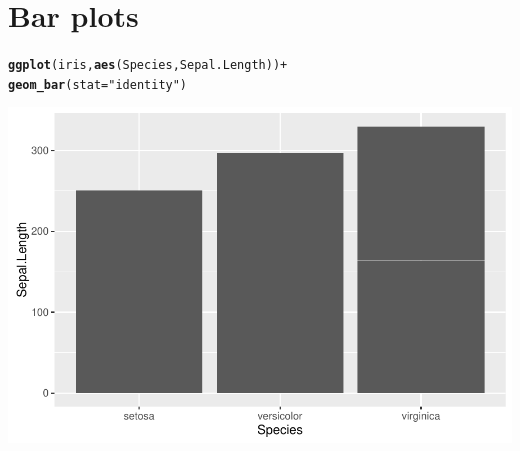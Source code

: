 \documentclass{beamer}\usepackage[]{graphicx}\usepackage[]{color}
\makeatletter
\newcommand{\hlstr}[1]{\textcolor[rgb]{0.192,0.494,0.8}{#1}}%
\newcommand{\hlopt}[1]{\textcolor[rgb]{0,0,0}{#1}}%
\newcommand{\hlstd}[1]{\textcolor[rgb]{0.345,0.345,0.345}{#1}}%
\newcommand{\hlkwc}[1]{\textcolor[rgb]{0.333,0.667,0.333}{#1}}%
\newcommand{\hlkwd}[1]{\textcolor[rgb]{0.737,0.353,0.396}{\textbf{#1}}}%
\newenvironment{kframe}{%
 \def\at@end@of@kframe{}%
 \ifinner\ifhmode%
  \def\at@end@of@kframe{\end{minipage}}%
  \begin{minipage}{\columnwidth}%
 \fi\fi%
 \def\FrameCommand##1{\hskip\@totalleftmargin \hskip-\fboxsep
 \colorbox{shadecolor}{##1}\hskip-\fboxsep
     \hskip-\linewidth \hskip-\@totalleftmargin \hskip\columnwidth}%
 \MakeFramed {\advance\hsize-\width
   \@totalleftmargin\z@ \linewidth\hsize
   \@setminipage}}%
 {\par\unskip\endMakeFramed%
 \at@end@of@kframe}
\newenvironment{knitrout}{}{} %
\makeatother
\begin{document}

\section*{Bar plots}
\frame{\sectionpage}


\begin{frame}[fragile]
\begin{knitrout}\footnotesize
{}\color{fgcolor}\begin{kframe}
\begin{alltt}
\hlkwd{ggplot}\hlstd{(iris,} \hlkwd{aes}\hlstd{(Species, Sepal.Length))} \hlopt{+}
        \hlkwd{geom_bar}\hlstd{(}\hlkwc{stat} \hlstd{=} \hlstr{"identity"}\hlstd{)}
\end{alltt}
\end{kframe}

{\centering \includegraphics[width=.75\linewidth]{figure/barone-1} 

}



\end{knitrout}

\end{frame}

\end{document}
